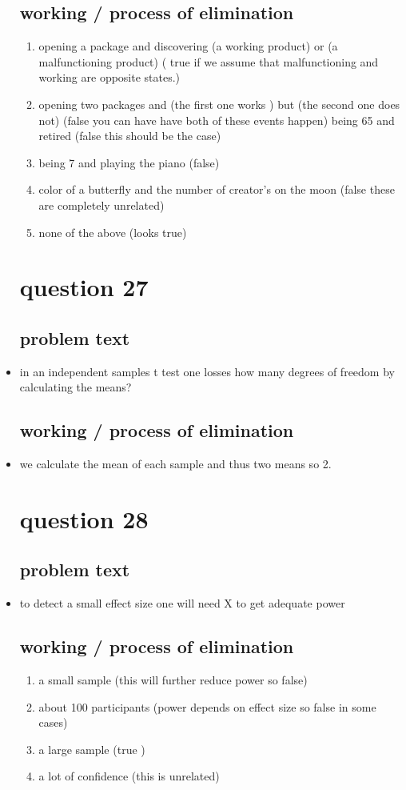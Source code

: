 \documentclass{article}
\begin{document}
\begin{itemize}
\subsection{working / process of elimination }
\begin{enumerate}
    \item opening a package and discovering (a working product) or (a malfunctioning product)  ( true if we assume that malfunctioning and working are opposite states.)
    \item opening two packages and (the first one works ) but (the second one does not) (false you can have have both of these events happen) 
    \itme being 65 and retired (false this should be the case)
    \item being 7 and playing the piano (false) 
    \item color of a butterfly and the number of creator's on the moon (false these are completely unrelated) 
    \item none of the above (looks true) 
\end{enumerate}

\section{question 27}
\subsection{problem text}
\item in an independent samples t test one losses how many degrees of freedom by calculating the means? 
\subsection{working / process of elimination }
\item we calculate the mean of each sample and thus two means so 2. 


\section{question 28}
\subsection{problem text}
\item to detect a small effect size one will need X to get adequate power
\subsection{working / process of elimination }
\begin{enumerate}
    \item a small sample (this will further reduce power so false)
    \item about 100 participants (power depends on effect size so false in some cases)
    \item a large sample (true )
    \item a lot of confidence (this is unrelated) 
\end{enumerate}


\end{itemize}
\end{document}
